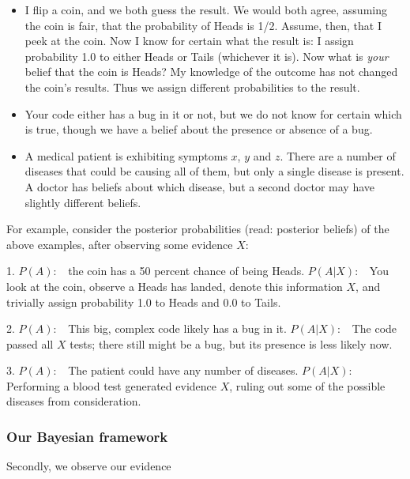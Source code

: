 \documentclass[titlepage]{article} %
\begin{document}
\begin{itemize}
\item
  I flip a coin, and we both guess the result. We would both agree,
  assuming the coin is fair, that the probability of Heads is 1/2.
  Assume, then, that I peek at the coin. Now I know for certain what the
  result is: I assign probability 1.0 to either Heads or Tails
  (whichever it is). Now what is \emph{your} belief that the coin is
  Heads? My knowledge of the outcome has not changed the coin's results.
  Thus we assign different probabilities to the result.
\item
  Your code either has a bug in it or not, but we do not know for
  certain which is true, though we have a belief about the presence or
  absence of a bug.
\item
  A medical patient is exhibiting symptoms $x$, $y$ and $z$. There are a
  number of diseases that could be causing all of them, but only a
  single disease is present. A doctor has beliefs about which disease,
  but a second doctor may have slightly different beliefs. \cite{Hef10}
\end{itemize}

For example, consider the posterior probabilities (read: posterior
beliefs) of the above examples, after observing some evidence $X$:

1. $P(A): \;\;$ the coin has a 50 percent chance of being Heads.
$P(A | X):\;\;$ You look at the coin, observe a Heads has landed, denote
this information $X$, and trivially assign probability 1.0 to Heads and
0.0 to Tails.

2. $P(A): \;\;$ This big, complex code likely has a bug in it.
$P(A | X): \;\;$ The code passed all $X$ tests; there still might be a
bug, but its presence is less likely now. \cite{Cou10}

3. $P(A):\;\;$ The patient could have any number of diseases.
$P(A | X):\;\;$ Performing a blood test generated evidence $X$, ruling
out some of the possible diseases from consideration.
\cite{PER-GRA:2007}

    \subsubsection{Our Bayesian framework}\label{our-bayesian-framework}

Secondly, we observe our evidence \cite{Perez2011,ganga09,SST}
\end{document}

